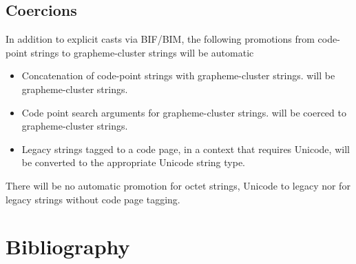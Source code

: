 \documentclass[b4paper]{article}
\begin{document}
\subsection{Coercions}
In addition to explicit casts via BIF/BIM, the following promotions
from code-point strings to grapheme-cluster strings will be automatic

\begin{itemize}
\item Concatenation of code-point strings with grapheme-cluster strings.
will be grapheme-cluster strings.
\item Code point search arguments for grapheme-cluster strings.
will be coerced to grapheme-cluster strings.
\item Legacy strings tagged to a code page, in a context that requires Unicode,
will be converted to the appropriate Unicode string type.
\end{itemize}

There will be no automatic promotion for octet strings, Unicode to
legacy nor for legacy strings without code page tagging.


\section{Bibliography}
\end{document}
